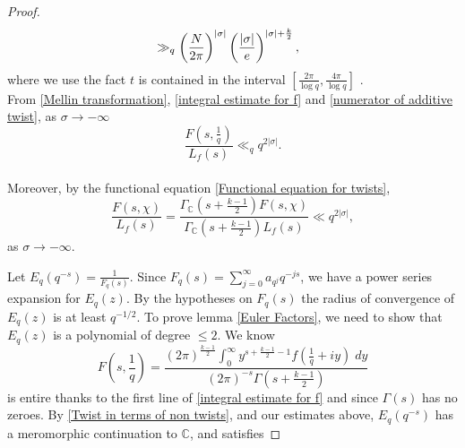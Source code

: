 \documentclass[a4paper,12.5pt]{amsart}
\theoremstyle{definition}
\theoremstyle{remark}
\newcommand{\F}{L_f}
\begin{document}
\begin{proof}
\begin{align}{\label{numerator of additive twist}}
     & \gg _q \left(\frac{N}{ 2 \pi} \right)^{|\sigma|}    
      \left(\frac{|\sigma|}{e}    \right)^{|\sigma| +\frac{k}{2}},
     \end{align}
    where we use the fact $t$ is contained in the interval $\left[ \frac{ 2 \pi }{\log q}, \frac{ 4 \pi }{\log q} \right] $   . \\
   From \eqref{Mellin transformation}, \eqref{integral estimate for f} and \eqref{numerator of additive twist}, as $\sigma \rightarrow - \infty$
    \[      \frac{F(s, \frac{1}{q})}{\F(s)} \ll_q q^{2 |\sigma|} .  \]
    \\ 
    Moreover, by  the functional equation \eqref{Functional equation for twists}, 
    \[  \frac{F(s,\chi)}{\F(s)} = \frac{\Gamma_{\mathbb{C}} \left(s+ \frac{k-1}{2} \right) F(s,\chi) }{    \Gamma_{\mathbb{C}} \left(s+ \frac{k-1}{2} \right) \F(s)  }    \ll q^{2 |\sigma|} ,         \]
    as $\sigma \rightarrow -\infty$. 

 Let $E_q(q^{-s})= \frac{1}{F_q(s)}$. Since $F_q(s)= \sum_{j=0}^{\infty} a_{q^j} q^{-js}$, we have a power series expansion for $E_q(z)$. By the hypotheses on $F_q(s)$ the radius of convergence of $E_q(z)$ is at least $q^{-1/2}$. 
 To prove  lemma \ref{Euler Factors}, we need to show that $E_q(z)$ is a polynomial of degree $\leq 2$.  We know
 \[  F(s, \frac{1}{q})= \frac{  (2 \pi)^ {  \frac{k-1}{2}} \int_{0}^{\infty} y^{s + \frac{k-1}{2} -1}  f( \frac{1}{q}+iy) \; dy }{(2 \pi)^{-s} \Gamma(s+\frac{k-1}{2})   }    \]
 is entire  thanks to the first line of  \eqref{integral estimate for f} and since $\Gamma(s)$ has no zeroes. By \eqref{Twist in terms of non twists}, and our estimates above, $E_q(q^{-s})$ has a meromorphic continuation to $\mathbb{C}$, and satisfies
 

\end{proof}
\end{document}

